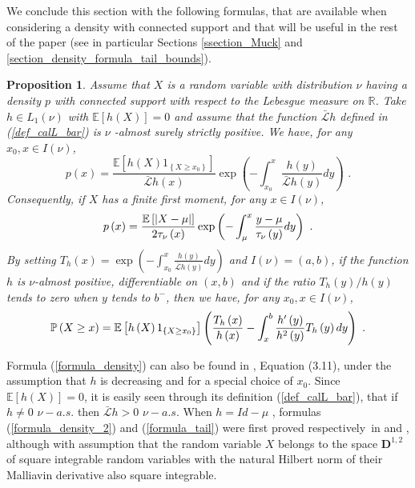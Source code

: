 \documentclass[11pt]{article}
\newtheorem{proposition}[theorem]{Proposition}
\begin{document}
We conclude this section with the following formulas, that are available
when considering a density with connected support and that will be useful in
the rest of the paper (see in particular Sections \ref{ssection_Muck} and %
\ref{section_density_formula_tail_bounds}).

\begin{proposition}
\label{theorem_formulas}Assume that $X$ is a random variable with
distribution $\nu $ having a density $p$ with connected support with respect
to the Lebesgue measure on $\mathbb{R}$. Take $h\in L_{1}\left( \nu \right) $
with $\mathbb{E}\left[ h\left( X\right) \right] =0$ and assume that the
function $\mathcal{\bar{L}}h$ defined in (\ref{def_calL_bar}) is $\nu $%
-almost surely strictly positive. We have, for any $x_{0},x\in I\left( \nu
\right) $,%
\begin{equation}
p\left( x\right) =\frac{\mathbb{E}\left[ h\left( X\right) 1_{\left\{ X\geq
x_{0}\right\} }\right] }{\mathcal{\bar{L}}h\left( x\right) }\exp \left(
-\int_{x_{0}}^{x}\frac{h\left( y\right) }{\mathcal{\bar{L}}h\left( y\right) }%
dy\right) \text{ .}  \label{formula_density}
\end{equation}%
Consequently, if $X$ has a finite first moment, for any $x\in I\left( \nu
\right) $,%
\begin{equation}
p\left( x\right) =\frac{\mathbb{E}\left[ \left\vert X-\mu \right\vert \right]
}{2\mathcal{\tau }_{\nu }\left( x\right) }\exp \left( -\int_{\mu }^{x}\frac{%
y-\mu }{\mathcal{\tau }_{\nu }\left( y\right) }dy\right) \text{ .}
\label{formula_density_2}
\end{equation}%
By setting $T_{h}\left( x\right) =\exp \left( -\int_{x_{0}}^{x}\frac{h\left(
y\right) }{\mathcal{\bar{L}}h\left( y\right) }dy\right) $ and $I\left( \nu
\right) =\left( a,b\right) $, if the function $h$ is $\nu $-almost positive,
differentiable on $\left( x,b\right) $ and if the ratio $T_{h}\left(
y\right) /h\left( y\right) $ tends to zero when $y$ tends to $b^{-}$, then
we have, for any $x_{0},x\in I\left( \nu \right) $,%
\begin{equation}
\mathbb{P}\left( X\geq x\right) =\mathbb{E}\left[ h\left( X\right)
1_{\left\{ X\geq x_{0}\right\} }\right] \left( \frac{T_{h}\left( x\right) }{%
h\left( x\right) }-\int_{x}^{b}\frac{h^{\prime }\left( y\right) }{%
h^{2}\left( y\right) }T_{h}\left( y\right) dy\right) \text{ .}
\label{formula_tail}
\end{equation}
\end{proposition}

Formula (\ref{formula_density}) can also be found in \cite{MR3418541},
Equation (3.11), under the assumption that $h$ is decreasing and for a
special choice of $x_{0}$. Since $\mathbb{E}\left[ h\left( X\right) \right]
=0$, it is easily seen through its definition (\ref{def_calL_bar}), that if $%
h\neq 0$ $\nu -a.s.$ then $\mathcal{\bar{L}}h>0$ $\nu -a.s.$ When $h=Id-\mu $%
, formulas (\ref{formula_density_2}) and (\ref{formula_tail}) were first
proved respectively\ in \cite{MR2556018} and \cite{MR2568291}, although with
assumption that the random variable $X$ belongs to the space $\mathbf{D}%
^{1,2}$ of square integrable random variables with the natural Hilbert norm
of their Malliavin derivative also square integrable.
\end{document}
